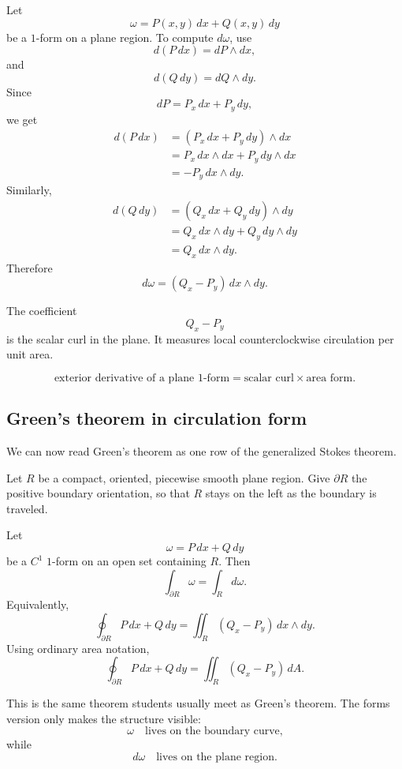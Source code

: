 Let
\[
    \omega=P(x,y)\,dx+Q(x,y)\,dy
\]
be a \(1\)-form on a plane region.  To compute \(d\omega\), use
\[
    d(P\,dx)=dP\wedge dx,
\]
and
\[
    d(Q\,dy)=dQ\wedge dy.
\]
Since
\[
    dP=P_x\,dx+P_y\,dy,
\]
we get
\[
\begin{aligned}
    d(P\,dx)
    &=
    (P_x\,dx+P_y\,dy)\wedge dx\\
    &=
    P_x\,dx\wedge dx+P_y\,dy\wedge dx\\
    &=
    -P_y\,dx\wedge dy.
\end{aligned}
\]
Similarly,
\[
\begin{aligned}
    d(Q\,dy)
    &=
    (Q_x\,dx+Q_y\,dy)\wedge dy\\
    &=
    Q_x\,dx\wedge dy+Q_y\,dy\wedge dy\\
    &=
    Q_x\,dx\wedge dy.
\end{aligned}
\]
Therefore
\[
\boxed{
    d\omega=(Q_x-P_y)\,dx\wedge dy.
}
\]

The coefficient
\[
    Q_x-P_y
\]
is the scalar curl in the plane.  It measures local counterclockwise circulation per
unit area.

\[
\boxed{
    \text{exterior derivative of a plane }1\text{-form}
    =
    \text{scalar curl}\times\text{area form}.
}
\]

\subsection{Green's theorem in circulation form}

We can now read Green's theorem as one row of the generalized Stokes theorem.

\begin{theorem}
Let \(R\) be a compact, oriented, piecewise smooth plane region.  Give
\(\partial R\) the positive boundary orientation, so that \(R\) stays on the left as the
boundary is traveled.

Let
\[
    \omega=P\,dx+Q\,dy
\]
be a \(C^1\) \(1\)-form on an open set containing \(R\).  Then
\[
\boxed{
    \int_{\partial R}\omega=\int_R d\omega.
}
\]
Equivalently,
\[
\boxed{
    \oint_{\partial R}P\,dx+Q\,dy
    =
    \iint_R (Q_x-P_y)\,dx\wedge dy.
}
\]
Using ordinary area notation,
\[
\boxed{
    \oint_{\partial R}P\,dx+Q\,dy
    =
    \iint_R (Q_x-P_y)\,dA.
}
\]
\end{theorem}

This is the same theorem students usually meet as Green's theorem.  The forms version
only makes the structure visible:
\[
    \omega
    \quad\text{lives on the boundary curve,}
\]
while
\[
    d\omega
    \quad\text{lives on the plane region.}
\]

